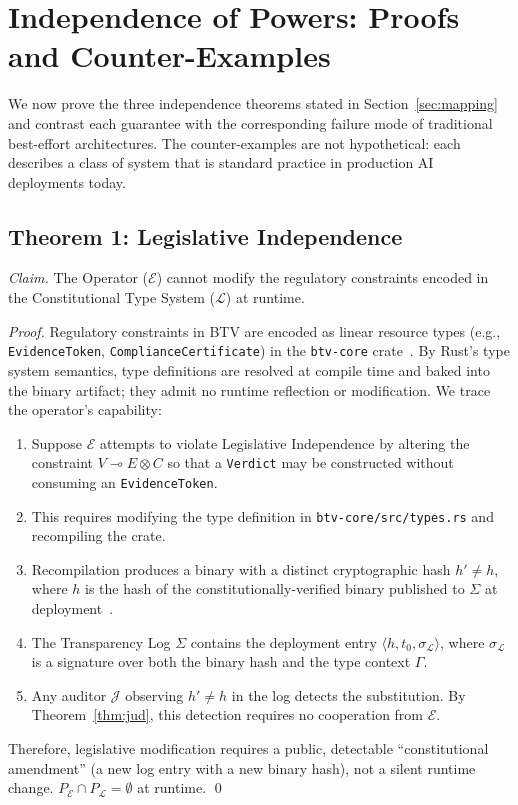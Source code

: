 \section{Independence of Powers: Proofs and Counter-Examples}
\label{sec:independence}

We now prove the three independence theorems stated in
Section~\ref{sec:mapping} and contrast each guarantee with the
corresponding failure mode of traditional best-effort architectures.
The counter-examples are not hypothetical: each describes a class of
system that is standard practice in production AI deployments today.

\subsection{Theorem 1: Legislative Independence}
\label{subsec:proof-leg}

\textit{Claim.} The Operator ($\mathcal{E}$) cannot modify the
regulatory constraints encoded in the Constitutional Type System
($\mathcal{L}$) at runtime.

\begin{proof}
Regulatory constraints in BTV are encoded as linear resource types
(e.g., \texttt{EvidenceToken}, \texttt{ComplianceCertificate}) in
the \texttt{btv-core} crate~\cite{btv2026}. By Rust's type system
semantics, type definitions are resolved at compile time and baked
into the binary artifact; they admit no runtime reflection or
modification. We trace the operator's capability:

\begin{enumerate}
  \item Suppose $\mathcal{E}$ attempts to violate Legislative
  Independence by altering the constraint $V \multimap E \otimes C$
  so that a \texttt{Verdict} may be constructed without consuming an
  \texttt{EvidenceToken}.
  \item This requires modifying the type definition in
  \texttt{btv-core/src/types.rs} and recompiling the crate.
  \item Recompilation produces a binary with a distinct
  cryptographic hash $h'\neq h$, where $h$ is the hash of the
  constitutionally-verified binary published to $\Sigma$ at
  deployment~\cite{btv-t-repo}.
  \item The Transparency Log $\Sigma$ contains the deployment
  entry $\langle h, t_0, \sigma_{\mathcal{L}} \rangle$, where
  $\sigma_{\mathcal{L}}$ is a signature over both the binary hash
  and the type context $\Gamma$.
  \item Any auditor $\mathcal{J}$ observing $h' \neq h$ in the
  log detects the substitution. By Theorem~\ref{thm:jud}, this
  detection requires no cooperation from $\mathcal{E}$.
\end{enumerate}

Therefore, legislative modification requires a public, detectable
``constitutional amendment'' (a new log entry with a new binary hash),
not a silent runtime change. $P_{\mathcal{E}} \cap P_{\mathcal{L}}
= \emptyset$ at runtime. \qed
\end{proof}

